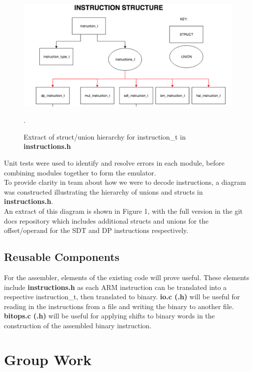 \documentclass[10pt,twoside]{article}
\begin{document}
\begin{figure}
\centering
\vspace{-20pt}
\includegraphics[width=\hsize]{figures/ARMStructure}
\caption{\label{fig:ARMStructure} Extract of struct/union hierarchy for instruction\_t in \textbf{instructions.h}}.
\end{figure}

Unit tests were used to identify and resolve errors in each module, before combining modules together to form the emulator. \\ 
To provide clarity in team about how we were to decode instructions, a diagram was constructed illustrating the hierarchy of unions and structs in \textbf{instructions.h}. \\ 
An extract of this diagram is shown in Figure 1, with the full version in the git docs repository which includes additional structs and unions for the offset/operand for the SDT and DP instructions respectively. 
\subsection*{Reusable Components}
For the assembler, elements of the existing code will prove useful. These elements include \textbf{instructions.h} as each ARM instruction can be translated into a respective instruction\_t, then translated to binary. \textbf{io.c (.h)} will be useful for reading in the instructions from a file and writing the binary to another file. \textbf{bitops.c (.h)} will be useful for applying shifts to binary words in the construction of the assembled binary instruction. 

\section{Group Work}
\end{document}
